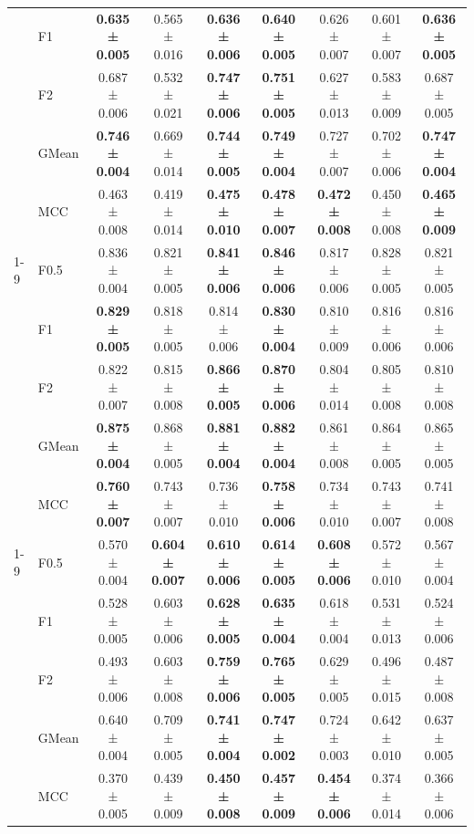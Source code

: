 \begin{table}[H]
{\begin{tabular}{llccccccc}
 & F1 & \textbf{0.635 ± 0.005} & 0.565 ± 0.016 & \textbf{0.636 ± 0.006} & \textbf{0.640 ± 0.005} & 0.626 ± 0.007 & 0.601 ± 0.007 & \textbf{0.636 ± 0.005} \\
 & F2 & 0.687 ± 0.006 & 0.532 ± 0.021 & \textbf{0.747 ± 0.006} & \textbf{0.751 ± 0.005} & 0.627 ± 0.013 & 0.583 ± 0.009 & 0.687 ± 0.005 \\
 & GMean & \textbf{0.746 ± 0.004} & 0.669 ± 0.014 & \textbf{0.744 ± 0.005} & \textbf{0.749 ± 0.004} & 0.727 ± 0.007 & 0.702 ± 0.006 & \textbf{0.747 ± 0.004} \\
 & MCC & 0.463 ± 0.008 & 0.419 ± 0.014 & \textbf{0.475 ± 0.010} & \textbf{0.478 ± 0.007} & \textbf{0.472 ± 0.008} & 0.450 ± 0.008 & \textbf{0.465 ± 0.009} \\
\cline{1-9}
\multirow[t]{5}{*}{LGBM()} & F0.5 & 0.836 ± 0.004 & 0.821 ± 0.005 & \textbf{0.841 ± 0.006} & \textbf{0.846 ± 0.006} & 0.817 ± 0.006 & 0.828 ± 0.005 & 0.821 ± 0.005 \\
 & F1 & \textbf{0.829 ± 0.005} & 0.818 ± 0.005 & 0.814 ± 0.006 & \textbf{0.830 ± 0.004} & 0.810 ± 0.009 & 0.816 ± 0.006 & 0.816 ± 0.006 \\
 & F2 & 0.822 ± 0.007 & 0.815 ± 0.008 & \textbf{0.866 ± 0.005} & \textbf{0.870 ± 0.006} & 0.804 ± 0.014 & 0.805 ± 0.008 & 0.810 ± 0.008 \\
 & GMean & \textbf{0.875 ± 0.004} & 0.868 ± 0.005 & \textbf{0.881 ± 0.004} & \textbf{0.882 ± 0.004} & 0.861 ± 0.008 & 0.864 ± 0.005 & 0.865 ± 0.005 \\
 & MCC & \textbf{0.760 ± 0.007} & 0.743 ± 0.007 & 0.736 ± 0.010 & \textbf{0.758 ± 0.006} & 0.734 ± 0.010 & 0.743 ± 0.007 & 0.741 ± 0.008 \\
\cline{1-9}
\multirow[t]{5}{*}{LogisticRegression()} & F0.5 & 0.570 ± 0.004 & \textbf{0.604 ± 0.007} & \textbf{0.610 ± 0.006} & \textbf{0.614 ± 0.005} & \textbf{0.608 ± 0.006} & 0.572 ± 0.010 & 0.567 ± 0.004 \\
 & F1 & 0.528 ± 0.005 & 0.603 ± 0.006 & \textbf{0.628 ± 0.005} & \textbf{0.635 ± 0.004} & 0.618 ± 0.004 & 0.531 ± 0.013 & 0.524 ± 0.006 \\
 & F2 & 0.493 ± 0.006 & 0.603 ± 0.008 & \textbf{0.759 ± 0.006} & \textbf{0.765 ± 0.005} & 0.629 ± 0.005 & 0.496 ± 0.015 & 0.487 ± 0.008 \\
 & GMean & 0.640 ± 0.004 & 0.709 ± 0.005 & \textbf{0.741 ± 0.004} & \textbf{0.747 ± 0.002} & 0.724 ± 0.003 & 0.642 ± 0.010 & 0.637 ± 0.005 \\
 & MCC & 0.370 ± 0.005 & 0.439 ± 0.009 & \textbf{0.450 ± 0.008} & \textbf{0.457 ± 0.009} & \textbf{0.454 ± 0.006} & 0.374 ± 0.014 & 0.366 ± 0.006 \\

\end{tabular}}
\end{table}
